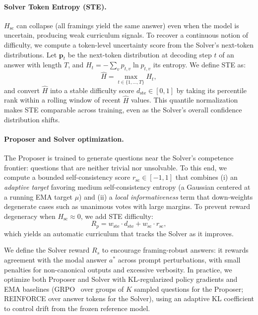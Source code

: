 \paragraph{Solver Token Entropy (STE).}
$H_{\text{sc}}$ can collapse (all framings yield the same answer) even when the model is uncertain, producing weak curriculum signals. To recover a continuous notion of difficulty, we compute a token-level uncertainty score from the Solver’s next-token distributions. Let $\mathbf{p}_t$ be the next-token distribution at decoding step $t$ of an answer with length $T$, and $H_t = -\sum_{v} p_{t,v} \ln p_{t,v}$ its entropy. We define STE as:
\begin{equation}
    \hat{H} = \max_{t \in \{1, \ldots, T\}} H_t,
    \label{eq:ste}
\end{equation}
and convert $\hat{H}$ into a stable difficulty score $d_{\text{ste}}\in[0,1]$ by taking its percentile rank within a rolling window of recent $\hat{H}$ values. This quantile normalization makes STE comparable across training, even as the Solver’s overall confidence distribution shifts.

\paragraph{Proposer and Solver optimization.}
The Proposer is trained to generate questions near the Solver’s competence frontier: questions that are neither trivial nor unsolvable. To this end, we compute a bounded self-consistency score $r_{\text{sc}}\in[-1,1]$ that combines (i) an \emph{adaptive target} favoring medium self-consistency entropy (a Gaussian centered at a running EMA target $\mu$) and (ii) a \emph{local informativeness} term that down-weights degenerate cases such as unanimous votes with large margins. To prevent reward degeneracy when $H_{\text{sc}}\!\approx\!0$, we add STE difficulty:
\begin{equation}
    R_p = w_{\text{ste}} \cdot d_{\text{ste}} + w_{\text{sc}} \cdot r_{\text{sc}},
    \label{eq:proposer_reward}
\end{equation}
which yields an automatic curriculum that tracks the Solver as it improves.

We define the Solver reward $R_s$ to encourage framing-robust answers: it rewards agreement with the modal answer $a^*$ across prompt perturbations, with small penalties for non-canonical outputs and excessive verbosity. In practice, we optimize both Proposer and Solver with KL-regularized policy gradients and EMA baselines (GRPO~\cite{shao2024deepseekmath} over groups of $K$ sampled questions for the Proposer; REINFORCE over answer tokens for the Solver), using an adaptive KL coefficient to control drift from the frozen reference model.

